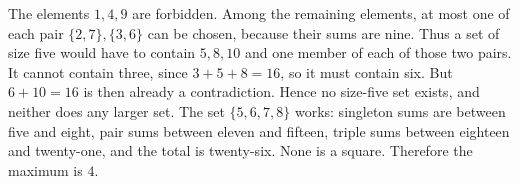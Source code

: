 The elements $1,4,9$ are forbidden. Among the remaining elements, at most one of each pair $\{2,7\},\{3,6\}$ can be chosen, because their sums are nine. Thus a set of size five would have to contain $5,8,10$ and one member of each of those two pairs.
It cannot contain three, since $3+5+8=16$, so it must contain six. But $6+10=16$ is then already a contradiction. Hence no size-five set exists, and neither does any larger set.
The set $\{5,6,7,8\}$ works: singleton sums are between five and eight, pair sums between eleven and fifteen, triple sums between eighteen and twenty-one, and the total is twenty-six. None is a square. Therefore the maximum is $\boxed4$.
